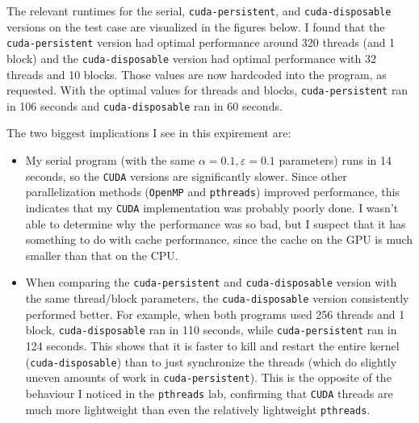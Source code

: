 \documentclass{article}
\begin{document}
The relevant runtimes for the serial, \texttt{cuda-persistent}, and \texttt{cuda-disposable}
versions on the test case are visualized in the figures below. I found that the
\texttt{cuda-persistent} version had optimal performance around 320 threads (and 1 block) and
the \texttt{cuda-disposable} version had optimal performance with 32 threads and 10 blocks.
Those values are now hardcoded into the program, as requested.
With the optimal values for threads and blocks,
\texttt{cuda-persistent} ran in 106 seconds and \texttt{cuda-disposable}
ran in 60 seconds.

The two biggest implications I see in this expirement are:
\begin{itemize}
    \item My serial program (with the same $\alpha=0.1, \varepsilon=0.1$
    parameters) runs in 14 seconds, so the \texttt{CUDA} versions are
    significantly slower. Since other parallelization methods (\texttt{OpenMP}
    and \texttt{pthreads}) improved performance, this indicates that my
    \texttt{CUDA} implementation was probably poorly done. I wasn't able to
    determine why the performance was so bad, but I suspect that it has
    something to do with cache performance, since the cache on the GPU is much
    smaller than that on the CPU.

    \item When comparing the \texttt{cuda-persistent} and
    \texttt{cuda-disposable} version with the same thread/block parameters, the
    \texttt{cuda-disposable} version consistently performed better. For
    example, when both programs used 256 threads and 1 block,
    \texttt{cuda-disposable} ran in 110 seconds, while \texttt{cuda-persistent}
    ran in 124 seconds.  This shows that it is faster to kill and restart the
    entire kernel (\texttt{cuda-disposable}) than to just synchronize the
    threads (which do slightly uneven amounts of work in
    \texttt{cuda-persistent}).  This is the opposite of the behaviour I noticed
    in the \texttt{pthreads} lab, confirming that \texttt{CUDA} threads are
    much more lightweight than even the relatively lightweight
    \texttt{pthreads}.
\end{itemize}
\end{document}
